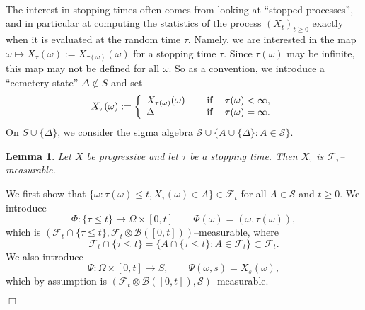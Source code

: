 \documentclass{article}
\newcommand{\coloneq}{:=}
\newcommand{\nin}{\not\in}
\newcommand{\textbf}[1]{\text{{\bfseries{#1}}}}
\newenvironment{proof}{\noindent\textbf{Proof\ }}{\hspace*{\fill}$\Box$\medskip}
\newtheorem{lemma}{Lemma}
\newcommand{\1}{\1}
\begin{document}
{\

The interest in stopping times often comes from looking at ``stopped
processes'', and in particular at computing the statistics of the process
$(X_t)_{t \geqslant 0}$ exactly when it is evaluated at the random time
$\tau$. Namely, we are interested in the map $\omega \mapsto X_{\tau} (\omega)
\coloneq X_{\tau (\omega)} (\omega)$ for a stopping time $\tau$. Since $\tau
(\omega)$ may be infinite, this map may not be defined for all $\omega$. So as
a convention, we introduce a ``cemetery state'' $\Delta \nin S$ and set
\[ X_{\tau} (\omega) \coloneq \left\{ \begin{array}{ll}
     X_{\tau (\omega)} (\omega) \hspace{1.2em} & \operatorname{if} \quad \tau (\omega)
     < \infty,\\
     \Delta & \operatorname{if} \quad \tau (\omega) = \infty .
   \end{array} \right. \]
On $S \cup \{ \Delta \}$, we consider the sigma algebra $\mathcal{S} \cup \{ A
\cup \{ \Delta \} : A \in \mathcal{S} \}$.

\begin{lemma}
  \label{lem:progressively measurable in stopping time}Let $X$ be progressive
  and let $\tau$ be a stopping time. Then $X_{\tau}$ is
  $\mathcal{F}_{\tau}$--measurable.
\end{lemma}

\begin{proof}
  We first show that $\{\omega : \tau (\omega) \leqslant t, X_{\tau} (\omega)
  \in A\} \in \mathcal{F}_t$ for all $A \in \mathcal{S}$ and $t \geqslant 0$.
  We introduce
  \[ \Phi : \{\tau \leqslant t\} \rightarrow \Omega \times [0, t]  \qquad \Phi
     (\omega) = (\omega, \tau (\omega)), \]
  which is $(\mathcal{F}_t \cap \{\tau \leqslant t\}, \mathcal{F}_t \otimes
  \mathcal{B}([0, t]))$--measurable, where
  \[ \mathcal{F}_t \cap \{\tau \leqslant t\} = \{A \cap \{\tau \leqslant t\}:
     A \in \mathcal{F}_t \} \subset \mathcal{F}_t . \]
  We also introduce
  \[ \Psi : \Omega \times [0, t] \rightarrow S, \qquad \Psi (\omega, s) = X_s
     (\omega), \]
  which by assumption is $(\mathcal{F}_t \otimes \mathcal{B}([0, t]),
  \mathcal{S})$--measurable.
  

\end{proof}}
\end{document}
